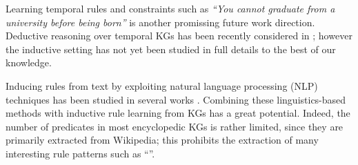 Learning temporal rules and constraints such as \emph{``You cannot graduate from a university before being born''} is another promissing future work direction. Deductive reasoning over temporal KGs has been recently considered in \cite{DBLP:conf/aaai/ChekolPSS17}; however the inductive setting has not yet been studied in full details to the best of our knowledge.

 Inducing rules from text by exploiting natural language processing (NLP) techniques has been studied in several works . Combining these linguistics-based methods with inductive rule learning from KGs has a great potential. Indeed, the number of predicates in most encyclopedic KGs is rather limited, since they are primarily extracted from Wikipedia; this prohibits the extraction of many interesting rule patterns such as ``''. %





